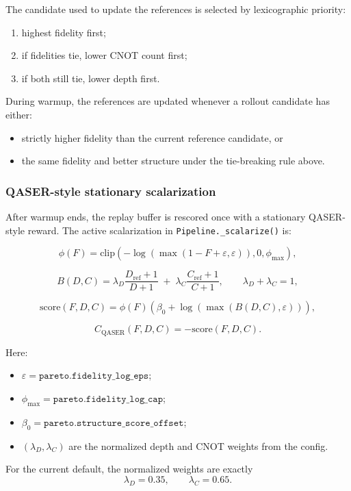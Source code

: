 \documentclass[11pt]{article}
\begin{document}
The candidate used to update the references is selected by lexicographic priority:
\begin{enumerate}[leftmargin=*]
\item highest fidelity first;
\item if fidelities tie, lower CNOT count first;
\item if both still tie, lower depth first.
\end{enumerate}

During warmup, the references are updated whenever a rollout candidate has either:
\begin{itemize}[leftmargin=*]
\item strictly higher fidelity than the current reference candidate, or
\item the same fidelity and better structure under the tie-breaking rule above.
\end{itemize}

\subsubsection{QASER-style stationary scalarization}

After warmup ends, the replay buffer is rescored once with a stationary QASER-style reward. The active scalarization in \texttt{Pipeline.\_scalarize()} is:

\[
\phi(F)
=
\mathrm{clip}\!\left(
-\log\!\left(\max(1-F+\varepsilon,\varepsilon)\right),
0,\phi_{\max}
\right),
\]

\[
B(D,C)
=
\lambda_D \frac{D_{\mathrm{ref}}+1}{D+1}
\;+\;
\lambda_C \frac{C_{\mathrm{ref}}+1}{C+1},
\qquad
\lambda_D + \lambda_C = 1,
\]

\[
\mathrm{score}(F,D,C)
=
\phi(F)\left(\beta_0 + \log(\max(B(D,C),\varepsilon))\right),
\]

\[
C_{\mathrm{QASER}}(F,D,C)
=
-\mathrm{score}(F,D,C).
\]

Here:
\begin{itemize}[leftmargin=*]
\item $\varepsilon = \texttt{pareto.fidelity\_log\_eps}$;
\item $\phi_{\max} = \texttt{pareto.fidelity\_log\_cap}$;
\item $\beta_0 = \texttt{pareto.structure\_score\_offset}$;
\item $(\lambda_D,\lambda_C)$ are the normalized depth and CNOT weights from the config.
\end{itemize}

For the current default, the normalized weights are exactly
\[
\lambda_D = 0.35, \qquad \lambda_C = 0.65.
\]
\end{document}

